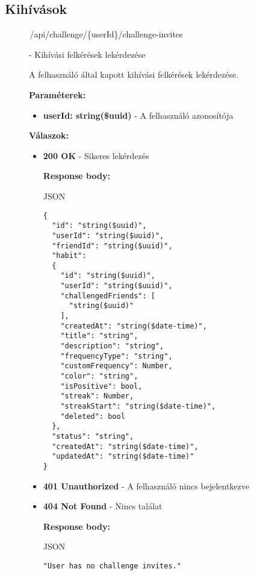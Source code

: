 \documentclass[12pt]{report}
\newcommand{\httpGet}[1]{\colorbox{getColor}{\textbf{\textcolor{white}{GET}}}~#1}
\begin{document}
\subsection{Kihívások}
\begin{description}
  \item[\httpGet{/api/challenge/\{userId\}/challenge-invites}] - Kihívási felkérések lekérdezése
  
    \vspace{0.5cm}
    A felhasználó által kapott kihívási felkérések lekérdezése.

    \vspace{0.5cm}
    \textbf{Paraméterek:}
    \begin{itemize}
      \item \textbf{userId: string(\$uuid)} - A felhasználó azonosítója
    \end{itemize}

    \vspace{0.5cm}
    \textbf{Válaszok:}
    \begin{itemize}
      \item \textbf{200 OK} - Sikeres lekérdezés

        \textbf{Response body:}
        \begin{codeblock}{JSON}
          \begin{verbatim}
{
  "id": "string($uuid)",
  "userId": "string($uuid)",
  "friendId": "string($uuid)",
  "habit": 
  {
    "id": "string($uuid)",
    "userId": "string($uuid)",
    "challengedFriends": [
      "string($uuid)"
    ],
    "createdAt": "string($date-time)",
    "title": "string",
    "description": "string",
    "frequencyType": "string",
    "customFrequency": Number,
    "color": "string",
    "isPositive": bool,
    "streak": Number,
    "streakStart": "string($date-time)",
    "deleted": bool
  },
  "status": "string",
  "createdAt": "string($date-time)",
  "updatedAt": "string($date-time)"
}
          \end{verbatim}
        \end{codeblock}

      \item \textbf{401 Unauthorized} - A felhasználó nincs bejelentkezve

      \item \textbf{404 Not Found} - Nincs találat

        \textbf{Response body:}
        \begin{codeblock}{JSON}
          \begin{verbatim}
"User has no challenge invites."
          \end{verbatim}
        \end{codeblock}


\end{itemize}
\end{description}
\end{document}

